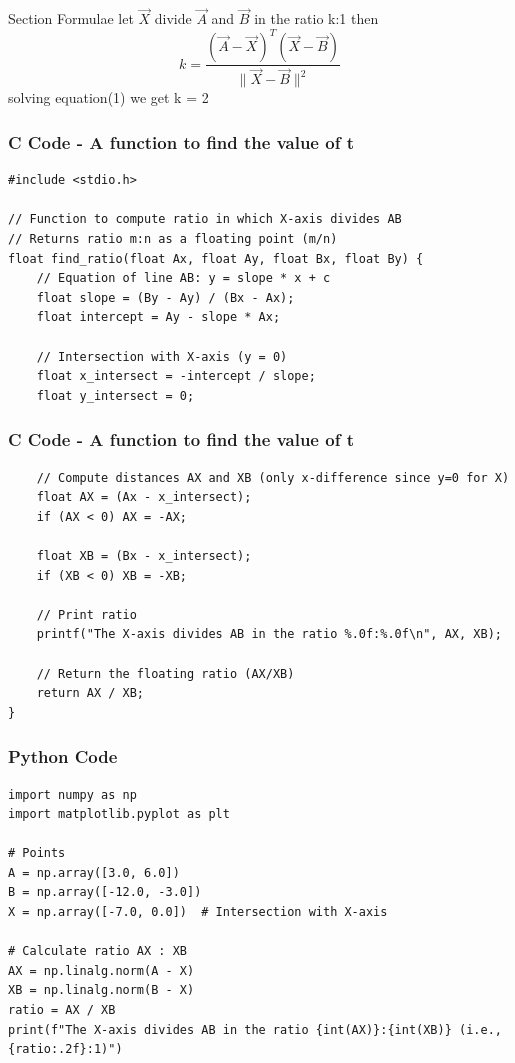 \documentclass{beamer}
\begin{document}
\begin{frame}{Section Formulae}
let $\vec{X}$ divide $\vec{A}$ and $\vec{B}$ in the ratio k:1 then \\
\begin{equation}
k = \frac{(\vec{A} - \vec{X})^T (\vec{X} - \vec{B})}{\|\vec{X} - \vec{B}\|^2}
\end{equation}
solving equation(1) we get k = 2
\end{frame}


\begin{frame}[fragile]
    \frametitle{C Code - A function to find the value of t}

    \begin{lstlisting}
#include <stdio.h>

// Function to compute ratio in which X-axis divides AB
// Returns ratio m:n as a floating point (m/n)
float find_ratio(float Ax, float Ay, float Bx, float By) {
    // Equation of line AB: y = slope * x + c
    float slope = (By - Ay) / (Bx - Ax);
    float intercept = Ay - slope * Ax;

    // Intersection with X-axis (y = 0)
    float x_intersect = -intercept / slope;
    float y_intersect = 0;
     \end{lstlisting}
\end{frame}


    
\begin{frame}[fragile]
    \frametitle{C Code - A function to find the value of t}

    \begin{lstlisting}
    // Compute distances AX and XB (only x-difference since y=0 for X)
    float AX = (Ax - x_intersect);
    if (AX < 0) AX = -AX;

    float XB = (Bx - x_intersect);
    if (XB < 0) XB = -XB;

    // Print ratio
    printf("The X-axis divides AB in the ratio %.0f:%.0f\n", AX, XB);

    // Return the floating ratio (AX/XB)
    return AX / XB;
}

    \end{lstlisting}
\end{frame}

\begin{frame}[fragile]
    \frametitle{Python Code}
    \begin{lstlisting}
import numpy as np
import matplotlib.pyplot as plt

# Points
A = np.array([3.0, 6.0])
B = np.array([-12.0, -3.0])
X = np.array([-7.0, 0.0])  # Intersection with X-axis

# Calculate ratio AX : XB
AX = np.linalg.norm(A - X)
XB = np.linalg.norm(B - X)
ratio = AX / XB
print(f"The X-axis divides AB in the ratio {int(AX)}:{int(XB)} (i.e., {ratio:.2f}:1)")


    \end{lstlisting}
\end{frame}
\end{document}
